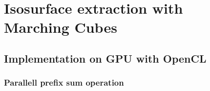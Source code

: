 \chapter{Isosurface extraction with Marching Cubes}

\begin{tikzpicture}[z={(-0.5cm,-0.25cm)}, scale=2]

\end{tikzpicture}

\section{Implementation on GPU with OpenCL}
\subsection{Parallell prefix sum operation}
